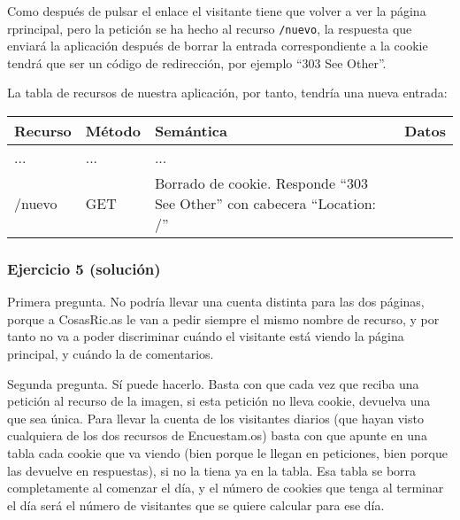 Como después de pulsar el enlace el visitante tiene que volver a ver la página rprincipal, pero la petición se ha hecho al recurso \texttt{/nuevo}, la respuesta que enviará la aplicación después de borrar la entrada correspondiente a la cookie tendrá que ser un código de redirección, por ejemplo ``303 See Other''.

La tabla de recursos de nuestra aplicación, por tanto, tendría una nueva entrada:

\begin{tabular}{|l|l|l|l|}
  \hline
  Recurso & Método & Semántica & Datos \\ \hline\hline
  ...     & ...    & ... & \\
  /nuevo & GET & Borrado de cookie. Responde ``303 See Other'' con cabecera ``Location: /'' &  \\
  \hline
\end{tabular}


\subsubsection{Ejercicio 5  (solución)}

Primera pregunta. No podría llevar una cuenta distinta para las dos páginas, porque a CosasRic.as le van a pedir siempre el mismo nombre de recurso, y por tanto no va a poder discriminar cuándo el visitante está viendo la página principal, y cuándo la de comentarios.

Segunda pregunta. Sí puede hacerlo. Basta con que cada vez que reciba una petición al recurso de la imagen, si esta petición no lleva cookie, devuelva una que sea única. Para llevar la cuenta de los visitantes diarios (que hayan visto cualquiera de los dos recursos de Encuestam.os) basta con que apunte en una tabla cada cookie que va viendo (bien porque le llegan en peticiones, bien porque las devuelve en respuestas), si no la tiena ya en la tabla. Esa tabla se borra completamente al comenzar el día, y el número de cookies que tenga al terminar el día será el número de visitantes que se quiere calcular para ese día.

